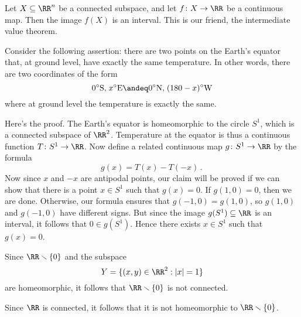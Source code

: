 \begin{exm}
	Let $X \subseteq \RR^n$ be a connected subspace, and let $f \colon X \to \RR$ be a continuous map.
	Then the image $f(X)$ is an interval.
	This is our friend, the intermediate value theorem.

	Consider the following assertion: there are two %
	points on the Earth's equator that, at ground level, have exactly the same temperature.%
	In other words, there are two coordinates of the form
	\[
		0^{\circ}\text{S,} \; x^{\circ}\text{E} \andeq 0^{\circ}\text{N,} \; (180-x)^{\circ}\text{W}
	\]
	where at ground level the temperature is exactly the same.
	
	Here's the proof.
	The Earth's equator is homeomorphic to the circle $S^1$, which is a connected subspace of $\RR^2$.
	Temperature at the equator is thus a continuous function $T \colon S^1 \to \RR$.
	Now define a related continuous map $ g \colon S^1 \to \RR$ by the formula
	\[
		g(x) = T(x)-T(-x) \period
	\]
	Now since $x$ and $-x$ are antipodal points, our claim will be proved if we can show that there is a point $x\in S^1 $ such that $g(x)=0$.
	If $g(1,0)=0$, then we are done.
	Otherwise, our formula ensures that $g(-1,0)=g(1,0)$, so $g(1,0)$ and $g(-1,0)$ have different signs.%
	But since the image $g(S^1) \subseteq\RR$ is an interval, it follows that $ 0 \in g(S^1)$.
	Hence there exists $ x \in S^1$ such that $g(x)=0$.
\end{exm}

\begin{exm}
	Since $\RR \smallsetminus\{0\} $ and the subspace
	\[
		Y = \{(x,y) \in \RR^2 : |x|=1\}
	\]
	are homeomorphic, it follows that $\RR\smallsetminus \{0\}$ is not connected.

	Since $\RR$ is connected, it follows that it is not homeomorphic to $\RR \smallsetminus \{0\}$.
\end{exm}

